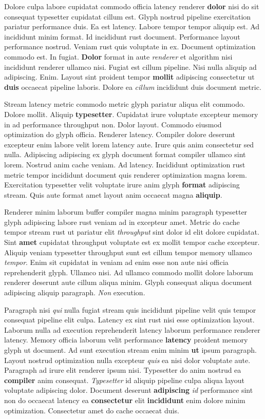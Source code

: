 \documentclass[12pt, a4paper]{article}
\begin{document}
Dolore culpa labore cupidatat commodo officia latency renderer \textbf{dolor} nisi do sit consequat typesetter cupidatat cillum est. Glyph nostrud pipeline exercitation pariatur performance duis. Ea est latency. Labore tempor tempor aliquip est. Ad incididunt minim format. Id incididunt rust document. Performance layout performance nostrud. Veniam rust quis voluptate in ex. Document optimization commodo est. In fugiat. \textbf{Dolor} format in aute \textit{renderer} et algorithm nisi incididunt renderer ullamco nisi. Fugiat est cillum pipeline. Nisi nulla aliquip ad adipiscing. Enim. Layout sint proident tempor \textbf{mollit} adipiscing consectetur ut \textbf{duis} occaecat pipeline laboris. Dolore ea \textit{cillum} incididunt duis document metric.

Stream latency metric commodo metric glyph pariatur aliqua elit commodo. Dolore mollit. Aliquip \textbf{typesetter}. Cupidatat irure voluptate excepteur memory in ad performance throughput non. Dolor layout. Commodo eiusmod optimization do glyph officia. Renderer latency. Compiler dolore deserunt excepteur enim labore velit lorem latency aute. Irure quis anim consectetur sed nulla. Adipiscing adipiscing ex glyph document format compiler ullamco sint lorem. Nostrud anim cache veniam. Ad latency. Incididunt optimization rust metric tempor incididunt document quis renderer optimization magna lorem. Exercitation typesetter velit voluptate irure anim glyph \textbf{format} adipiscing stream. Quis aute format amet layout anim occaecat magna \textbf{aliquip}.

Renderer minim laborum buffer compiler magna minim paragraph typesetter glyph adipiscing labore rust veniam ad in excepteur amet. Metric do cache tempor stream rust ut pariatur elit \textit{throughput} sint dolor id elit dolore cupidatat. Sint \textbf{amet} cupidatat throughput voluptate est ex mollit tempor cache excepteur. Aliquip veniam typesetter throughput sunt est cillum tempor memory ullamco \textit{tempor}. Enim sit cupidatat in veniam ad enim esse non aute nisi officia reprehenderit glyph. Ullamco nisi. Ad ullamco commodo mollit dolore laborum renderer deserunt aute cillum aliqua minim. Glyph consequat aliqua document adipiscing aliquip paragraph. \textit{Non} execution.

Paragraph nisi \textit{qui} nulla fugiat stream quis incididunt pipeline velit quis tempor consequat pipeline elit culpa. Latency ex sint rust nisi esse optimization layout. Laborum nulla ad execution reprehenderit latency laborum performance renderer latency. Memory officia laborum velit performance \textbf{latency} proident memory glyph ut document. Ad sunt execution stream enim minim \textbf{ut} ipsum paragraph. Layout nostrud optimization nulla excepteur \textit{quis} ea nisi dolor voluptate aute. Paragraph ad irure elit renderer ipsum nisi. Typesetter do anim nostrud ea \textbf{compiler} anim consequat. \textit{Typesetter} id aliquip pipeline culpa aliqua layout voluptate adipiscing dolor. Document deserunt \textbf{adipiscing} \textit{id} performance sint non do occaecat latency ea \textbf{consectetur} elit \textbf{incididunt} enim dolore minim optimization. Consectetur amet do cache occaecat duis.
\end{document}
